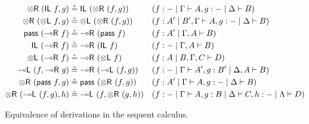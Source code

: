 \documentclass[runningheads]{llncs}
\newcommand{\tl}{\otimes \mathsf{L}}
\newcommand{\tr}{\otimes \mathsf{R}}
\newcommand{\lright}{{\multimap}\mathsf{R}}
\newcommand{\lleft}{{\multimap}\mathsf{L}}
\newcommand{\pass}{\mathsf{pass}}
\newcommand{\unitl}{\mathsf{IL}}
\newcommand{\unitr}{\mathsf{IR}}
\newcommand{\lolliR}{\lright}
\newcommand{\ax}{\mathsf{ax}}
\newcommand{\ot}{\otimes}
\newcommand{\lolli}{\multimap}
\newcommand{\I}{\mathsf{I}}
\newcommand{\SkNMILL}{\texttt{SkNMILL}}
\begin{document}
\begin{figure}[t]
\begin{align*}\small
  \tr \text{ } (\unitl \text{ } f, g) &\circeq \unitl \text{ } (\tr \text{ } (f , g)) &&(f : - \mid \Gamma \vdash A , g : - \mid \Delta \vdash B)
  \\
  \tr \text{ } (\tl \text{ } f, g) &\circeq \tl \text{ } (\tr \text{ } (f , g)) &&(f : A' \mid B' , \Gamma \vdash A , g : - \mid \Delta \vdash B)
  \\
  \pass \text{ } (\lolliR \text{ } f) &\circeq \lolliR \text{ } (\pass \text{ } f) &&(f : A' \mid \Gamma , A \vdash B)
  \\
  \unitl \text{ } (\lolliR \text{ } f) &\circeq \lolliR \text{ } (\unitl \text{ } f) &&(f : - \mid \Gamma , A \vdash B)
  \\
  \tl \text{ } (\lolliR \text{ } f) &\circeq \lolliR \text{ } (\tl \text{ } f) &&(f : A \mid B , \Gamma , C \vdash D)
  \\
  \lleft \text{ } (f, \lolliR \text{ } g) &\circeq \lolliR \text{ } (\lleft \text{ } (f, g)) &&(f : - \mid \Gamma \vdash A', g : B' \mid \Delta , A \vdash B)
  \\%
  \tr \text{ } (\pass \text{ } f, g) &\circeq \pass \text{ } (\tr \text{ } (f, g)) &&(f : A' \mid \Gamma \vdash A, g : - \mid \Delta \vdash B)
  \\
  \tr \text{ } (\lleft \text{ } (f , g), h) & \circeq \lleft \text{ } (f, \tr \text{ } (g, h)) &&(f: - \mid \Gamma \vdash A, g : B \mid \Delta \vdash C, h : - \mid \Lambda \vdash D)
\end{align*}
\caption{Equivalence of derivations in the sequent calculus.}
\label{fig:circeq}
\end{figure}
\end{document}

